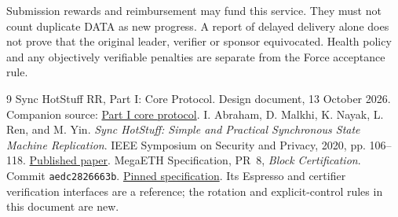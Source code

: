 \documentclass[11pt,a4paper]{article}
\newcounter{protocol}
\begin{document}
Submission rewards and reimbursement may fund this service. They must not
count duplicate DATA as new progress. A report of delayed delivery
alone does not prove that the original leader, verifier or sponsor
equivocated. Health policy and any objectively verifiable penalties
are separate from the Force acceptance rule.

\begingroup\small
\begin{thebibliography}{9}
Sync HotStuff RR, Part I: Core Protocol. Design document, 13 October 2026.
Companion source: \href{run:sync_hotstuff_rr_part1_core.tex}{Part I core protocol}.
I. Abraham, D. Malkhi, K. Nayak, L. Ren, and M. Yin.
\emph{Sync HotStuff: Simple and Practical Synchronous State Machine Replication}.
IEEE Symposium on Security and Privacy, 2020, pp. 106--118.
\href{https://conferences.computer.org/sp/pdfs/sp/2020/349700a106.pdf}{Published paper}.
MegaETH Specification, PR~8, \emph{Block Certification}.
Commit \texttt{aedc2826663b}.
\href{https://github.com/megaeth-labs/specification/tree/aedc2826663b134ee25d26bea17e70c6d23d321c/specs/block-certification}{Pinned specification}.
Its Espresso and certifier verification interfaces are a reference;
the rotation and explicit-control rules in this document are new.
\end{thebibliography}
\endgroup
\end{document}
